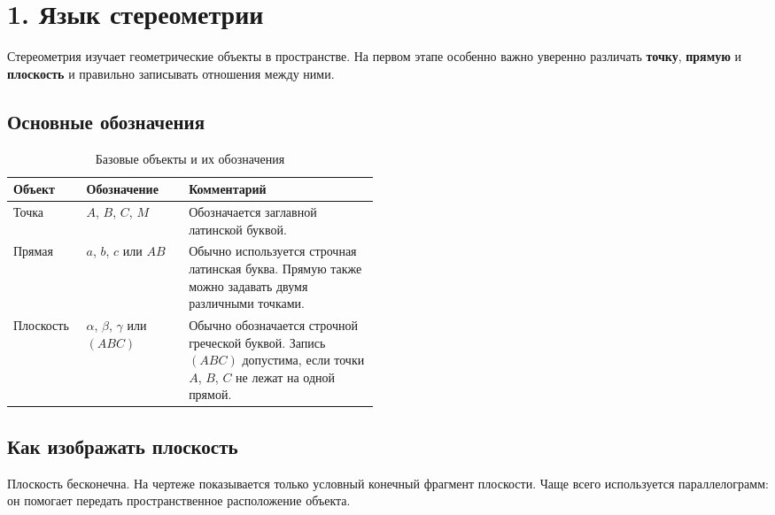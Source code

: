 \documentclass[a4paper,12pt]{article}
\newcommand{\term}[1]{\textcolor{darkaccent}{\textbf{#1}}}
\newcommand{\plane}[1]{(#1)}
\begin{document}

\section*{\textcolor{darkaccent}{1. Язык стереометрии}}

Стереометрия изучает геометрические объекты в пространстве. На первом этапе особенно важно уверенно различать \term{точку}, \term{прямую} и \term{плоскость} и правильно записывать отношения между ними.

\subsection*{\textcolor{accent}{Основные обозначения}}

\begin{table}[h!]
\centering
\caption{Базовые объекты и их обозначения}
\begin{tabularx}{\linewidth}{@{}p{0.20\linewidth}p{0.28\linewidth}X@{}}
\toprule
\textbf{Объект} & \textbf{Обозначение} & \textbf{Комментарий} \\
\midrule
Точка
&
$A$, $B$, $C$, $M$
&
Обозначается заглавной латинской буквой.
\\

Прямая
&
$a$, $b$, $c$ или $AB$
&
Обычно используется строчная латинская буква. Прямую также можно задавать двумя различными точками.
\\

Плоскость
&
$\alpha$, $\beta$, $\gamma$ или $\plane{ABC}$
&
Обычно обозначается строчной греческой буквой. Запись $\plane{ABC}$ допустима, если точки $A$, $B$, $C$ не лежат на одной прямой.
\\
\bottomrule
\end{tabularx}
\end{table}

\subsection*{\textcolor{accent}{Как изображать плоскость}}

Плоскость бесконечна. На чертеже показывается только условный конечный фрагмент плоскости. Чаще всего используется параллелограмм: он помогает передать пространственное расположение объекта.
\end{document}
